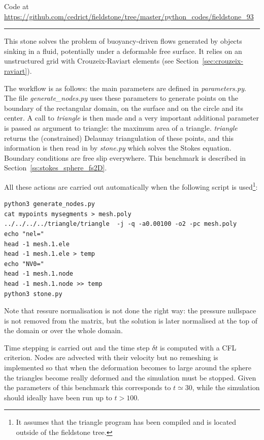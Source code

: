 

\begin{center}
Code at \url{https://github.com/cedrict/fieldstone/tree/master/python_codes/fieldstone_93}
\end{center}

\par\noindent\rule{\textwidth}{0.4pt}



This stone solves the problem of buoyancy-driven flows generated 
by objects sinking in a fluid, potentially under a deformable free surface.
It relies on an unstructured grid with Crouzeix-Raviart elements (see Section~\ref{sec:crouzeix-raviart}).

The workflow is as follows: the main parameters are defined in {\sl parameters.py}.
The file {\sl generate\_nodes.py} uses these parameters to generate points on the 
boundary of the rectangular domain, on the surface and on the circle and its center. 
A call to {\sl triangle} is then made and a very important additional parameter is passed
as argument to triangle: the maximum area of a triangle. 
{\sl triangle} returns the (constrained) Delaunay triangulation of these points, 
and this information is then read in by {\sl stone.py} which solves the 
Stokes equation. 
Boundary conditions are free slip everywhere. This benchmark is described in 
Section~\ref{ss:stokes_sphere_fs2D}.

All these actions are carried out automatically when the following script is 
used\footnote{It assumes that the triangle program has been compiled and 
is located outside of the fieldstone tree.}:
\begin{lstlisting}
python3 generate_nodes.py
cat mypoints mysegments > mesh.poly
../../../../triangle/triangle  -j -q -a0.00100 -o2 -pc mesh.poly
echo "nel="
head -1 mesh.1.ele 
head -1 mesh.1.ele > temp
echo "NV0="
head -1 mesh.1.node 
head -1 mesh.1.node >> temp
python3 stone.py
\end{lstlisting}


Note that ressure normalisation is not done the right way: the pressure nullspace is 
not removed from the matrix, but the solution is later normalised at the top
of the domain or over the whole domain.

Time stepping is carried out and the time step $\delta t$ is computed with a CFL criterion.
Nodes are advected with their velocity but no remeshing is implemented so that when the 
deformation becomes to large around the sphere the triangles become really deformed and 
the simulation must be stopped. Given the parameters of this benchmark this corresponds 
to $t\simeq 30$, while the simulation should ideally have been run up to $t>100$.

